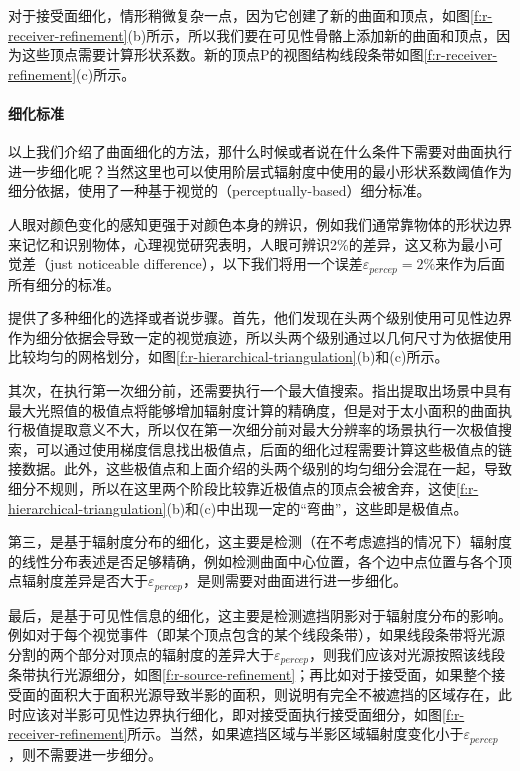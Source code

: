 对于接受面细化，情形稍微复杂一点，因为它创建了新的曲面和顶点，如图\ref{f:r-receiver-refinement}(b)所示，所以我们要在可见性骨骼上添加新的曲面和顶点，因为这些顶点需要计算形状系数。新的顶点P的视图结构线段条带如图\ref{f:r-receiver-refinement}(c)所示。




\paragraph{细化标准}
以上我们介绍了曲面细化的方法，那什么时候或者说在什么条件下需要对曲面执行进一步细化呢？当然这里也可以使用阶层式辐射度中使用的最小形状系数阈值作为细分依据，\cite{a:FastandAccurateHierarchicalRadiosityUsingGlobalVisibility}使用了一种基于视觉的（perceptually-based）细分标准。

人眼对颜色变化的感知更强于对颜色本身的辨识，例如我们通常靠物体的形状边界来记忆和识别物体，心理视觉研究\cite{a:Perceptually-drivenradiosity,a:Colordisplaysandcolorscience}表明，人眼可辨识2\%的差异，这又称为最小可觉差（just noticeable difference），以下我们将用一个误差$\varepsilon_{percep}=2\%$来作为后面所有细分的标准。

\cite{a:FastandAccurateHierarchicalRadiosityUsingGlobalVisibility}提供了多种细化的选择或者说步骤。首先，他们发现在头两个级别使用可见性边界作为细分依据会导致一定的视觉痕迹，所以头两个级别通过以几何尺寸为依据使用比较均匀的网格划分，如图\ref{f:r-hierarchical-triangulation}(b)和(c)所示。

其次，在执行第一次细分前，还需要执行一个最大值搜索。\cite{a:Accurateandconsistentreconstructionofilluminationfunctionsusingstructuredsampling}指出提取出场景中具有最大光照值的极值点将能够增加辐射度计算的精确度，但是对于太小面积的曲面执行极值提取意义不大，所以仅在第一次细分前对最大分辨率的场景执行一次极值搜索，可以通过使用梯度信息找出极值点，后面的细化过程需要计算这些极值点的链接数据。此外，这些极值点和上面介绍的头两个级别的均匀细分会混在一起，导致细分不规则，所以在这里两个阶段比较靠近极值点的顶点会被舍弃，这使\ref{f:r-hierarchical-triangulation}(b)和(c)中出现一定的“弯曲”，这些即是极值点。

第三，是基于辐射度分布的细化，这主要是检测（在不考虑遮挡的情况下）辐射度的线性分布表述是否足够精确，例如检测曲面中心位置，各个边中点位置与各个顶点辐射度差异是否大于$\varepsilon_{percep}$，是则需要对曲面进行进一步细化。

最后，是基于可见性信息的细化，这主要是检测遮挡阴影对于辐射度分布的影响。例如对于每个视觉事件（即某个顶点包含的某个线段条带），如果线段条带将光源分割的两个部分对顶点的辐射度的差异大于$\varepsilon_{percep}$，则我们应该对光源按照该线段条带执行光源细分，如图\ref{f:r-source-refinement}；再比如对于接受面，如果整个接受面的面积大于面积光源导致半影的面积，则说明有完全不被遮挡的区域存在，此时应该对半影可见性边界执行细化，即对接受面执行接受面细分，如图\ref{f:r-receiver-refinement}所示。当然，如果遮挡区域与半影区域辐射度变化小于$\varepsilon_{percep}$，则不需要进一步细分。




